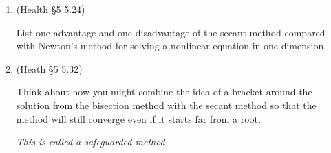 \documentclass[12pt,letterpaper,noanswers]{exam}
\begin{document}
\begin{enumerate}[resume=classQ]
\item (Health \S5 5.24)

List one advantage and one disadvantage of the secant method compared with Newton's method for solving a nonlinear equation in one dimension.
\vspace{0.5in}

\item (Heath \S5 5.32) 

Think about how you might combine the idea of  a bracket around the solution from the bisection method with the secant method so that the method will still converge even if it starts far from a root.

\emph{This is called a safeguarded method}

\vspace{0.5in}
\end{enumerate}
\end{document}
